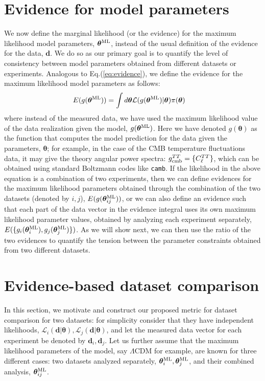 \documentclass[amsmath, prd, reprint, aps]{revtex4-1}
\newcommand{\dv}{\textbf{d}}
\newcommand{\tv}{\bm{\theta}}
\newcommand{\tML}{\tv^{\rm ML}}
\newcommand{\saroj}[1]{\textcolor{blue}{(Saroj: #1)}}
\begin{document}
\section{Evidence for model parameters}
We now define the marginal likelihood (or the evidence) for the maximum likelihood model parameters, $\tML$, instead of the usual definition of the evidence for the data, $\dv$. We do so as our primary goal is to quantify the level of consistency between model parameters obtained from different datasets or experiments. Analogous to Eq.(\ref{eq:evidence}), we define the evidence for the maximum likelihood model parameters as follows:
\begin{align}
	E(g(\tML)) &= \int d\tv \mathcal{L}(g(\tML)|\tv) \pi(\tv)
\end{align}
where instead of the measured data, we have used the maximum likelihood value of the data realization given the model, $g(\tML)$. Here we have denoted $g(\tv)$ as the function that computes the model prediction for the data given the parameters, $\tv$; for example, in the case of the CMB temperature fluctuations data, it may give the theory angular power spectra: $g_{\rm cmb}^{TT} = \{C_\ell^{TT}\}$, which can be obtained using standard Boltzmann codes like \texttt{camb}. If the likelihood in the above equation is a combination of two experiments, then we can define evidences for the maximum likelihood parameters obtained through the combination of the two datasets (denoted by $i,j$), $E(g(\tML_{ij}))$, or we can also define an evidence such that each part of the data vector in the evidence integral uses its own maximum likelihood parameter values, obtained by analyzing each experiment separately, $E(\{g_i(\tML_i), g_j(\tML_j)\})$. As we will show next, we can then use the ratio of the two evidences to quantify the tension between the parameter constraints obtained from two different datasets.


\section{Evidence-based dataset comparison} \label{sec:evidenceratio}
In this section, we motivate and construct our proposed metric for dataset comparison for two datasets: for simplicity consider that they have independent likelihoods, $\mathcal{L}_i(\dv|\tv), \mathcal{L}_j(\dv|\tv)$, and let the measured data vector for each experiment be denoted by $\dv_i, \dv_j$. Let us further assume that the maximum likelihood parameters of the model, say $\Lambda$CDM for example, are known for three different cases: two datasets analyzed separately, $\tML_i, \tML_j$, and their combined analysis, $\tML_{ij}$.
\end{document}
